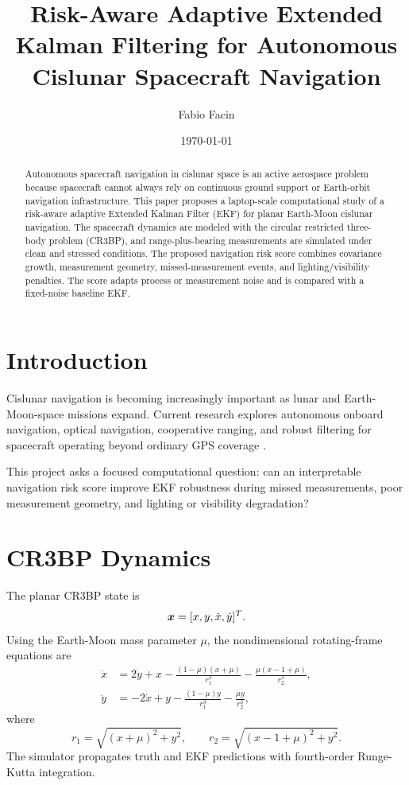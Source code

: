 \documentclass[11pt]{article}
\title{Risk-Aware Adaptive Extended Kalman Filtering for Autonomous Cislunar Spacecraft Navigation}
\author{Fabio Facin}
\date{\today}
\begin{document}
\maketitle

\begin{abstract}
Autonomous spacecraft navigation in cislunar space is an active aerospace
problem because spacecraft cannot always rely on continuous ground support or
Earth-orbit navigation infrastructure. This paper proposes a laptop-scale
computational study of a risk-aware adaptive Extended Kalman Filter (EKF) for
planar Earth-Moon cislunar navigation. The spacecraft dynamics are modeled with
the circular restricted three-body problem (CR3BP), and range-plus-bearing
measurements are simulated under clean and stressed conditions. The proposed
navigation risk score combines covariance growth, measurement geometry,
missed-measurement events, and lighting/visibility penalties. The score adapts
process or measurement noise and is compared with a fixed-noise baseline EKF.
\end{abstract}

\section{Introduction}

Cislunar navigation is becoming increasingly important as lunar and
Earth-Moon-space missions expand. Current research explores autonomous onboard
navigation, optical navigation, cooperative ranging, and robust filtering for
spacecraft operating beyond ordinary GPS coverage
\citep{AerospaceNASA2025Cislunar,NASA2024OpticalNavigation,OguriCislunarAutonomy}.

This project asks a focused computational question: can an interpretable
navigation risk score improve EKF robustness during missed measurements, poor
measurement geometry, and lighting or visibility degradation?

\section{CR3BP Dynamics}

The planar CR3BP state is
\begin{equation}
  \bm{x} = [x, y, \dot{x}, \dot{y}]^T.
\end{equation}
Using the Earth-Moon mass parameter $\mu$, the nondimensional rotating-frame
equations are
\begin{align}
  \ddot{x} &= 2\dot{y} + x
  - \frac{(1-\mu)(x+\mu)}{r_1^3}
  - \frac{\mu(x-1+\mu)}{r_2^3},\\
  \ddot{y} &= -2\dot{x} + y
  - \frac{(1-\mu)y}{r_1^3}
  - \frac{\mu y}{r_2^3},
\end{align}
where
\begin{equation}
  r_1 = \sqrt{(x+\mu)^2+y^2},\qquad
  r_2 = \sqrt{(x-1+\mu)^2+y^2}.
\end{equation}
The simulator propagates truth and EKF predictions with fourth-order
Runge-Kutta integration.
\end{document}
